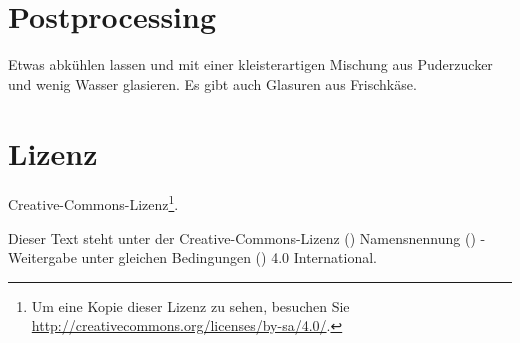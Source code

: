 \documentclass[a4paper, oneside]{recipe}
\begin{document}
\section*{Postprocessing}
Etwas abkühlen lassen und mit einer kleisterartigen Mischung aus Puderzucker und wenig Wasser glasieren. Es gibt auch Glasuren aus Frischkäse.

\section*{Lizenz}
\ccbysa{} Creative-Commons-Lizenz\footnote{Um eine Kopie dieser Lizenz zu sehen, besuchen Sie \url{http://creativecommons.org/licenses/by-sa/4.0/}.}.

Dieser Text steht unter der Creative-Commons-Lizenz (\ccLogo) Namensnennung (\ccAttribution) - Weitergabe unter gleichen Bedingungen (\ccShareAlike) 4.0 International. 
\end{document}
